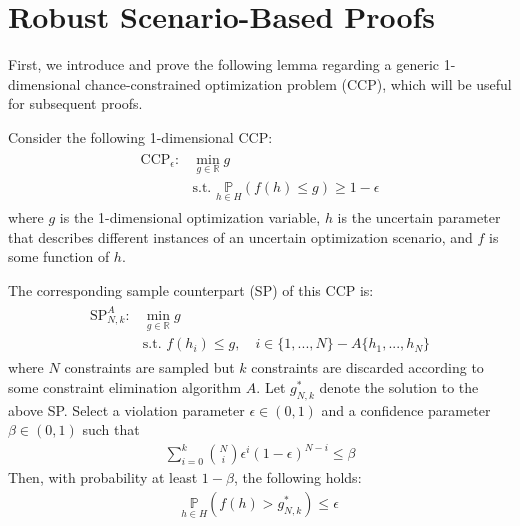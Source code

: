 \section{Robust Scenario-Based Proofs}\label{apd:SO}

First, we introduce and prove the following lemma regarding a generic 1-dimensional chance-constrained optimization problem (CCP), which will be useful for subsequent proofs.
\begin{lemma}\label{lemma:CCP}
    Consider the following 1-dimensional CCP:
    \begin{align}\label{eq:CCP}
    \begin{split}
        \text{CCP}_\epsilon: &\min_{g\in \mathbb{R}}{g} \\
        &\text{s.t. } \underset{h \in H}{\mathbb{P}} \left( f(h) \le g \right) \ge 1-\epsilon
    \end{split}
    \end{align}
    where $g$ is the 1-dimensional optimization variable, $h$ is the uncertain parameter that describes different instances of an uncertain optimization scenario, and $f$ is some function of $h$.
    
    The corresponding sample counterpart (SP) of this CCP is:
    \begin{align}\label{eq:SP}
    \begin{split}
        \text{SP}^A_{N,k}: &\min_{g \in \mathbb{R}}{g} \\
        &\text{s.t. } f(h_i) \le g, \quad i \in \{1, ..., N\}-A\{h_1, ..., h_N\}
    \end{split}
    \end{align}
    where $N$ constraints are sampled but $k$ constraints are discarded according to some constraint elimination algorithm $A$.
    Let $g^*_{N,k}$ denote the solution to the above SP. Select a violation parameter $\epsilon \in (0, 1)$ and a confidence parameter $\beta \in (0, 1)$ such that
    \begin{equation}\label{eq:parameters_relationship}
        \begin{aligned}
            \sum^k_{i=0} \binom{N}{i} \epsilon^i (1-\epsilon)^{N-i} \le \beta
        \end{aligned}
    \end{equation}
    Then, with probability at least $1-\beta$, the following holds:
    \begin{equation}\label{eq:CCP_guarantee}
        \begin{aligned}
            \underset{h \in H}{\mathbb{P}} \left( f(h) > g^*_{N,k} \right) \le \epsilon
        \end{aligned}
    \end{equation}
\end{lemma}
